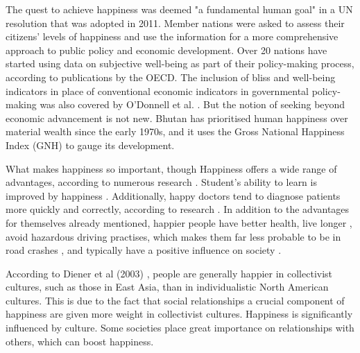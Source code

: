 \documentclass[12pt, a4paper, twoside]{report}
\theoremstyle{plain} %
\theoremstyle{definition} %
\theoremstyle{remark} %
\numberwithin{equation}{chapter}
\begin{document}
The quest to achieve happiness was deemed "a fundamental human goal" in a UN resolution that was adopted in 2011. Member nations were asked to assess their citizens' levels of happiness and use the information for a more comprehensive approach to public policy and economic development. Over 20 nations have started using data on subjective well-being as part of their policy-making process, according to publications by the OECD. The inclusion of bliss and well-being indicators in place of conventional economic indicators in governmental policy-making was also covered by O'Donnell et al. \cite{o2015national}. But the notion of seeking beyond economic advancement is not new. Bhutan has prioritised human happiness over material wealth since the early 1970s, and it uses the Gross National Happiness Index (GNH) to gauge its development.

What makes happiness so important, though Happiness offers a wide range of advantages, according to numerous research \cite{lyubomirsky2005benefits}. Student's ability to learn is improved by happiness \cite{durlak2011impact}. Additionally, happy doctors tend to diagnose patients more quickly and correctly, according to research \cite{estrada1997positive}. In addition to the advantages for themselves already mentioned, happier people have better health, live longer \cite{diener1994assessing}, avoid hazardous driving practises, which makes them far less probable to be in road crashes \cite{goudie2014happiness}, and typically have a positive influence on society 
\cite{guven2011happier}. 

According to Diener et al (2003) \cite{diener2003personality}, people are generally happier in collectivist cultures, such as those in East Asia, than in individualistic North American cultures. This is due to the fact that social relationships a crucial component of happiness are given more weight in collectivist cultures. Happiness is significantly influenced by culture. Some societies place great importance on relationships with others, which can boost happiness\cite{veenhoven2011happiness}.
\end{document}

